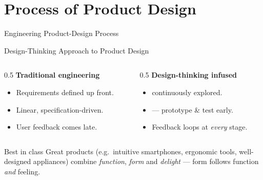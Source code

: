
\section{Process of Product Design}

\begin{frame}{Engineering Product-Design Process}
\end{frame}

\begin{frame}{Design-Thinking Approach to Product Design}
  \accentrule\\[0.3em]
  \begin{columns}[T]
    \begin{column}{0.5\textwidth}\small
      \textbf{Traditional engineering}
      \begin{itemize}\small
        \item Requirements defined up front.
        \item Linear, specification-driven.
        \item User feedback comes late.
      \end{itemize}
    \end{column}
    \begin{column}{0.5\textwidth}\small
      \textbf{Design-thinking infused}
      \begin{itemize}\small
        \item {} continuously explored.
        \item {} — prototype \& test early.
        \item Feedback loops at \emph{every} stage.
      \end{itemize}
    \end{column}
  \end{columns}
  \vspace{0.3em}
  \begin{block}{Best in class}\scriptsize
    Great products (e.g.\ intuitive smartphones, ergonomic tools,
    well-designed appliances) combine \emph{function}, \emph{form} and
    \emph{delight} — form follows function \emph{and} feeling.
  \end{block}
\end{frame}

